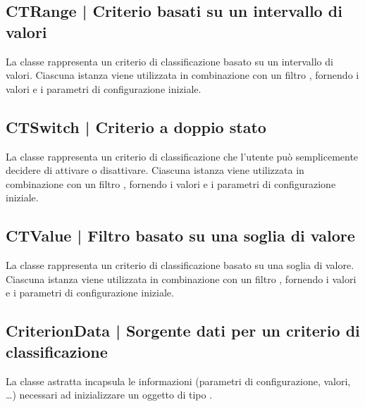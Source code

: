 \documentclass[10pt,a4paper,headinclude,footinclude,hidelinks]{scrreprt} %
\begin{document}
	\subsection[CTRange]{CTRange | Criterio basati su un intervallo di valori}
	\label{sec:stage:design:model.criteria:range-criterion}
	La classe \textit{} rappresenta un criterio di classificazione basato su un intervallo di valori. Ciascuna istanza viene utilizzata in combinazione con un filtro \textit{}, fornendo i valori e i parametri di configurazione iniziale.

	\subsection[CTSwitch]{CTSwitch | Criterio a doppio stato}
	\label{sec:stage:design:model.criteria:switch-criterion}
	La classe \textit{} rappresenta un criterio di classificazione che l'utente può semplicemente decidere di attivare o disattivare. Ciascuna istanza viene utilizzata in combinazione con un filtro \textit{}, fornendo i valori e i parametri di configurazione iniziale.

	\subsection[CTValue]{CTValue | Filtro basato su una soglia di valore}
	\label{sec:stage:design:model.criteria:value-criterion}
	La classe \textit{} rappresenta un criterio di classificazione basato su una soglia di valore. Ciascuna istanza viene utilizzata in combinazione con un filtro \textit{}, fornendo i valori e i parametri di configurazione iniziale.

	\subsection[CriterionData]{CriterionData | Sorgente dati per un criterio di classificazione}
	\label{sec:stage:design:model.criteria:criterion-data}
	La classe astratta \textit{} incapsula le informazioni (parametri di configurazione, valori, \ldots) necessari ad inizializzare un oggetto di tipo \textit{}.
\end{document}
